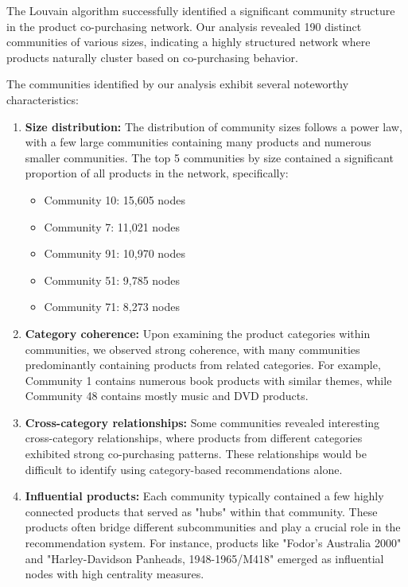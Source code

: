 \documentclass[conference]{IEEEtran}
\begin{document}
\label{sec:community-analysis}
The Louvain algorithm successfully identified a significant community structure in the product co-purchasing network. Our analysis revealed 190 distinct communities of various sizes, indicating a highly structured network where products naturally cluster based on co-purchasing behavior.

The communities identified by our analysis exhibit several noteworthy characteristics:

\begin{enumerate}
    \item \textbf{Size distribution:} The distribution of community sizes follows a power law, with a few large communities containing many products and numerous smaller communities. The top 5 communities by size contained a significant proportion of all products in the network, specifically:
    \begin{itemize}
        \item Community 10: 15,605 nodes
        \item Community 7: 11,021 nodes
        \item Community 91: 10,970 nodes
        \item Community 51: 9,785 nodes
        \item Community 71: 8,273 nodes
    \end{itemize}
    
    \item \textbf{Category coherence:} Upon examining the product categories within communities, we observed strong coherence, with many communities predominantly containing products from related categories. For example, Community 1 contains numerous book products with similar themes, while Community 48 contains mostly music and DVD products.
    
    \item \textbf{Cross-category relationships:} Some communities revealed interesting cross-category relationships, where products from different categories exhibited strong co-purchasing patterns. These relationships would be difficult to identify using category-based recommendations alone.
    
    \item \textbf{Influential products:} Each community typically contained a few highly connected products that served as "hubs" within that community. These products often bridge different subcommunities and play a crucial role in the recommendation system. For instance, products like "Fodor's Australia 2000" and "Harley-Davidson Panheads, 1948-1965/M418" emerged as influential nodes with high centrality measures.
\end{enumerate}
\end{document}
